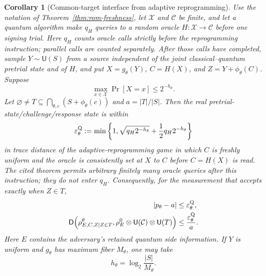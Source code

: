 \documentclass[pdflatex,sn-mathphys-num]{sn-jnl}
\theoremstyle{thmstyleone}
\newtheorem{corollary}[theorem]{Corollary}
\theoremstyle{thmstyletwo}
\newcommand{\Unif}{\mathsf{U}}
\begin{document}
\begin{corollary}[Common-target interface from adaptive reprogramming]
\label{thm:qrom-freshness}
Use the notation of Theorem~\ref{thm:rom-freshness}, let $\mathcal X$ and
$\mathcal C$ be finite, and let a quantum algorithm make $q_H$ queries to a
random oracle $H:\mathcal X\to\mathcal C$ before one signing trial.  Here
$q_H$ counts oracle calls strictly before the reprogramming instruction;
parallel calls are counted separately.  After those calls have completed,
sample $Y\sim\Unif(S)$ from a source independent of the joint
classical--quantum pretrial state and of $H$, and put
$X=g_\theta(Y)$, $C=H(X)$, and $Z=Y+\phi_\theta(C)$.  Suppose
\begin{equation}
 \max_{x\in\mathcal X}\Pr[X=x]
 \le 2^{-h_\theta}.                                 \label{eq:qrom-minentropy}
\end{equation}
Let $\varnothing\ne T\subseteq\bigcap_{\theta,c}(S+\phi_\theta(c))$ and
$a=|T|/|S|$.  Then the real pretrial-state/challenge/response state is within
\begin{equation}
 \varepsilon_\theta^{\rm Q}
 :=\min\left\{1,
       \sqrt{q_H2^{-h_\theta}}+\frac12q_H2^{-h_\theta}
       \right\}                                      \label{eq:qrom-ar-error}
\end{equation}
in trace distance of the adaptive-reprogramming game in which $C$ is freshly
uniform and the oracle is consistently set at $X$ to $C$ before $C=H(X)$ is
read.  The cited theorem permits arbitrary finitely many oracle queries after
this instruction; they do not enter $q_H$.  Consequently, for the measurement
that accepts exactly when $Z\in T$,
\begin{align}
 |p_\theta-a|&\le\varepsilon_\theta^{\rm Q},
                                                        \label{eq:qrom-accept}\\
 \mathsf D\!\left(\rho_{E,C,Z\mid Z\in T}^{\theta},
   \rho_E^0\otimes\Unif(\mathcal C)\otimes\Unif(T)\right)
 &\le\frac{\varepsilon_\theta^{\rm Q}}{a}.          \label{eq:qrom-output}
\end{align}
Here $E$ contains the adversary's retained quantum side information.  If
$Y$ is uniform and $g_\theta$ has maximum fiber $M_\theta$, one may take
\begin{equation}
 h_\theta=\log_2\frac{|S|}{M_\theta}.                \label{eq:qrom-fiber}
\end{equation}
\end{corollary}
\end{document}
